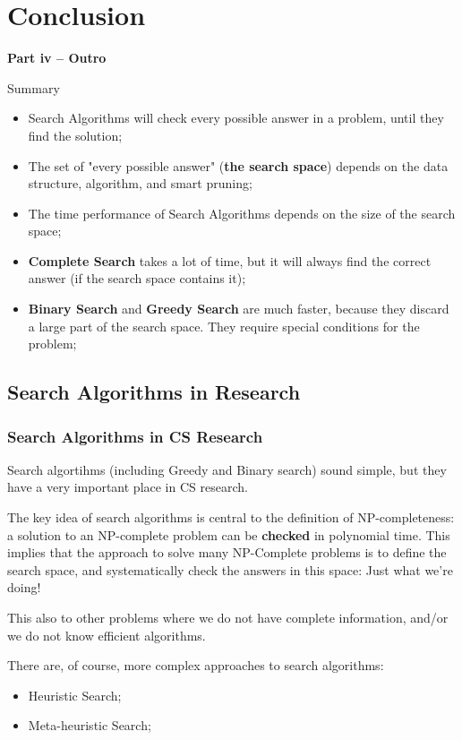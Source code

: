 \section{Conclusion}

\begin{frame}
  \begin{center}
    {\bf Part iv -- Outro}
  \end{center}
\end{frame}

\begin{frame}{Summary}
  \begin{itemize}
    \item Search Algorithms will check every possible answer in a problem, until they find the solution;
    \item The set of "every possible answer" ({\bf the search space}) depends on the data structure, algorithm, and smart pruning;
    \item The time performance of Search Algorithms depends on the size of the search space;
    \item {\bf Complete Search} takes a lot of time, but it will always find the correct answer (if the search space contains it);
    \item {\bf Binary Search} and {\bf Greedy Search} are much faster, because they discard a large part of the search space. They require special conditions for the problem;
  \end{itemize}
\end{frame}

\subsection{Search Algorithms in Research}

\begin{frame}
  \frametitle{Search Algorithms in CS Research}

  Search algortihms (including Greedy and Binary search) sound simple, but they have a very important place in CS research.\bigskip

  The key idea of search algorithms is central to the definition of NP-completeness: a solution to an NP-complete problem can be {\bf checked} in polynomial time. This implies that the approach to solve many NP-Complete problems is to define the search space, and systematically check the answers in this space: Just what we're doing!\bigskip

  This also to other problems where we do not have complete information, and/or we do not know efficient algorithms.\bigskip

  There are, of course, more complex approaches to search algorithms:
  \begin{itemize}
    \item Heuristic Search;
    \item Meta-heuristic Search;
  \end{itemize}
\end{frame}

